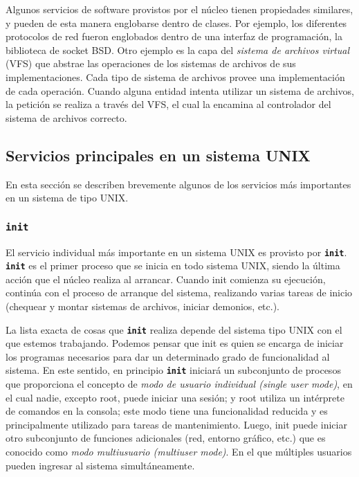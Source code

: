\documentclass[12pt]{article}
\begin{document}
Algunos servicios de software provistos por el núcleo tienen propiedades
similares, y pueden de esta manera englobarse dentro de clases. Por 
ejemplo, los diferentes protocolos de red fueron englobados dentro de 
una interfaz de programación, la biblioteca de socket BSD. Otro ejemplo 
es la capa del \textit{sistema de archivos virtual} (VFS) que abstrae 
las operaciones de los sistemas de archivos de sus implementaciones. 
Cada tipo de sistema de archivos provee una implementación de cada 
operación. Cuando alguna entidad intenta utilizar un sistema de archivos,
la petición se realiza a través del VFS, el cual la encamina al 
controlador del sistema de archivos correcto.


\subsection{Servicios principales en un sistema UNIX}

 En esta sección se describen brevemente algunos de los servicios más
importantes en un sistema de tipo UNIX.  

\subsubsection{\texttt{\textbf{init}}}

 El servicio individual más importante en un sistema UNIX es provisto por
\texttt{\textbf{init}}. \texttt{\textbf{init}} es el primer proceso que se
inicia en todo sistema UNIX, siendo la última acción que el núcleo 
realiza al arrancar.  Cuando init comienza su ejecución, continúa con el 
proceso de arranque del sistema, realizando varias tareas de inicio 
(chequear y montar sistemas de archivos, iniciar demonios, etc.).  

La lista exacta de cosas que \texttt{\textbf{init}} realiza depende del 
sistema tipo UNIX con el que estemos trabajando. Podemos pensar que init
es quien se encarga de iniciar los programas necesarios para dar 
un determinado grado de funcionalidad al sistema. En este sentido, en
principio 
\texttt{\textbf{init}} iniciará un subconjunto de procesos que 
proporciona el concepto de \textit{modo de usuario individual
 (single user mode)}, en el cual nadie, excepto root, puede iniciar una 
sesión; y root utiliza un intérprete de comandos en la consola; este 
modo tiene una funcionalidad reducida y es principalmente utilizado 
para tareas de mantenimiento. Luego, init puede iniciar otro subconjunto 
de funciones adicionales (red, entorno gráfico, etc.) que es conocido 
como \textit{modo multiusuario (multiuser mode)}. En el que múltiples 
usuarios pueden ingresar al sistema simultáneamente.
\end{document}
